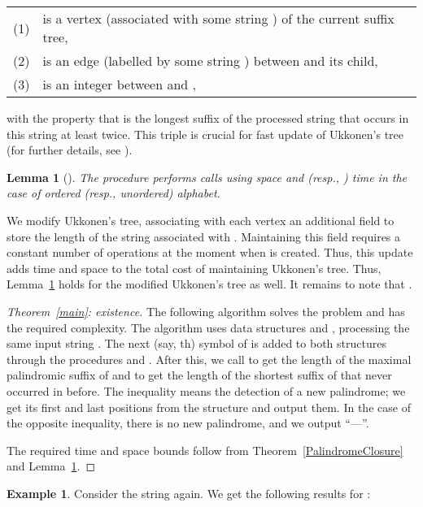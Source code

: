 \documentclass{article}
\theoremstyle{plain}
\newtheorem{lemma}{Lemma}[section]
\theoremstyle{definition}
\newtheorem{example}{Example}[section]
\begin{document}
\tabcolsep=3pt
\begin{tabular}{rl}
(1)& is a vertex (associated with some string ) of the current suffix tree,\\
(2)& is an edge (labelled by some string ) between  and its child,\\
(3)& is an integer between  and ,
\end{tabular}

\noindent with the property that  is the longest suffix of the processed string that occurs in this string at least twice. This triple is crucial for  fast update of Ukkonen's tree (for further details, see \cite{Ukk}).

\begin{lemma}[\cite{Ukk}] \label{lemukk}
The procedure  performs  calls using  space and  (resp., ) time in the case of ordered (resp., unordered) alphabet.
\end{lemma}

We modify Ukkonen's tree, associating with each vertex  an additional field  to store the length of the string associated with . Maintaining this field requires a constant number of operations at the moment when  is created. Thus, this update adds  time and  space to the total cost of maintaining Ukkonen's tree. Thus, Lemma~\ref{lemukk} holds for the modified Ukkonen's tree as well. It remains to note that .

\begin{proof}[Theorem~\ref{main}: existence]
The following algorithm solves the problem and has the required complexity. The algorithm uses data structures  and , processing the same input string . The next (say, th) symbol of  is added to both structures through the procedures  and . After this, we call  to get the length of the maximal palindromic suffix of  and  to get the length of the shortest suffix of  that never occurred in  before. The inequality  means the detection of a new palindrome; we get its first and last positions from the structure  and output them. In the case of the opposite inequality, there is no new palindrome, and we output ``---''.

The required time and space bounds follow from Theorem~\ref{PalindromeClosure} and Lemma~\ref{lemukk}.
\end{proof}

\begin{example}
Consider the string  again. We get the following results for :

\end{example}
\end{document}

